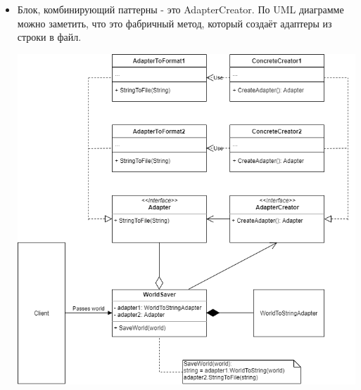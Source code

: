 \documentclass[14pt,fleqn]{article}
\begin{document}
{\begin{itemize}
Взяв эти адаптеры, WorldSaver переводит мир в строку, потом строку в файл, что и нужно было сделать по задаче.

\item Блок, комбинирующий паттерны - это AdapterCreator. По UML диаграмме можно заметить, что это фабричный метод, который создаёт адаптеры из строки в файл. 

\includegraphics[scale=0.7]{uml}

\end{itemize}
}
\end{document}
